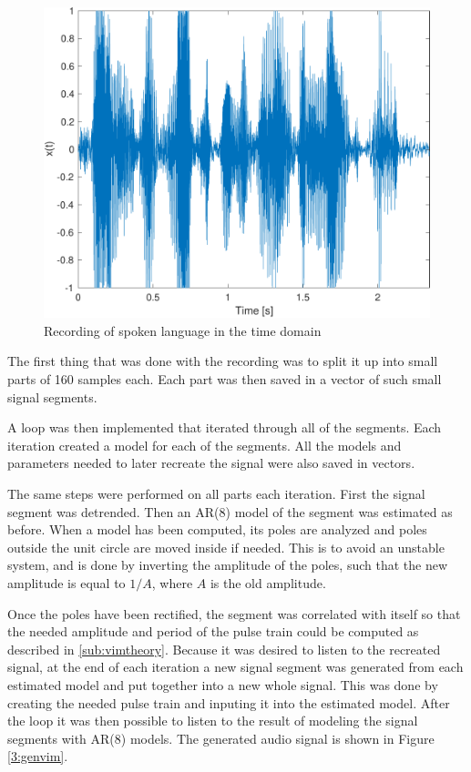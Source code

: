 \documentclass{IEEEtran}
\begin{document}
\begin{figure}[h]
  \centering
  \captionsetup{justification=centering}

  \includegraphics[width=0.8\columnwidth]{pictures/vim_orig.pdf}
  \caption{Recording of spoken language in the time domain}
  \label{3:rawvim}

\end{figure}

The first thing that was done with the recording was to split it up into
small parts of 160 samples each. Each part was then saved in a vector
of such small signal segments.

A loop was then implemented that iterated through all of the segments.
Each iteration created a model for each of the segments. All the models
and parameters needed to later recreate the signal were also saved in
vectors.

The same steps were performed on all parts each iteration. First the
signal segment was detrended. Then an AR(8) model of the segment was
estimated as before. When a model has been computed, its poles are
analyzed and poles outside the unit circle are moved inside if needed.
This is to avoid an unstable system, and is done by inverting the amplitude
of the poles, such that the new amplitude is equal to $1/A$, where $A$
is the old amplitude.

Once the poles
have been rectified, the segment was correlated with itself so that
the needed amplitude and period of the pulse train could be computed
as described in \ref{sub:vimtheory}. Because it was desired to listen
to the recreated signal, at the end of each iteration a new signal
segment was generated from each estimated model and put together into
a new whole signal. This was done by creating the needed pulse train
and inputing it into the estimated model. After the loop it was then
possible to listen to the result of modeling the signal segments with
AR(8) models. The generated audio signal is shown in Figure
\ref{3:genvim}.
\end{document}
